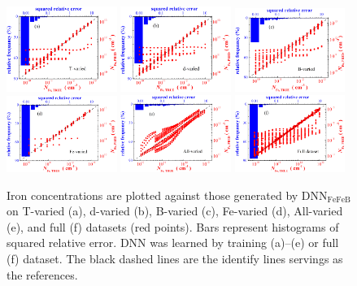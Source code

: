 \documentclass[num-refs]{wiley-article} %
\begin{document}
\begin{figure}[tb]
\centering
\includegraphics[width=0.32\textwidth]{Fig3a}
\includegraphics[width=0.32\textwidth]{Fig3b}
\includegraphics[width=0.32\textwidth]{Fig3c}
\includegraphics[width=0.32\textwidth]{Fig3d}
\includegraphics[width=0.32\textwidth]{Fig3e}
\includegraphics[width=0.32\textwidth]{Fig3f}
\caption{Iron concentrations are plotted against those generated by DNN$_\mathrm{FeFeB}$
on  T-varied (a),
d-varied (b),
B-varied (c),
Fe-varied (d),
All-varied (e),
and full (f) datasets (red points).
Bars represent histograms of squared relative error.
DNN was learned by training (a)--(e) or full (f) dataset.
The black dashed lines are the identify lines servings as the references.}
\label{fig_TrDNN1}
\end{figure}
\end{document}
